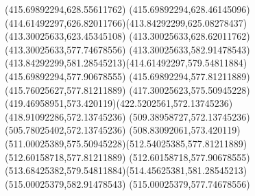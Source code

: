 {{{\lineto(415.69892294,628.55611762)
\lineto(415.69892294,628.46145096)
\curveto(414.61492297,626.82011766)(413.84292299,625.08278437)(413.30025633,623.45345108)
\lineto(413.30025633,628.62011762)
\closepath
\moveto(413.30025633,577.74678556)
\lineto(413.30025633,582.91478543)
\curveto(413.84292299,581.28545213)(414.61492297,579.54811884)(415.69892294,577.90678555)
\lineto(415.69892294,577.81211889)
\lineto(415.76025627,577.81211889)
\curveto(417.30025623,575.50945228)(419.46958951,573.420119)(422.5202561,572.13745236)
\lineto(418.91092286,572.13745236)
\closepath
\moveto(509.38958727,572.13745236)
\lineto(505.78025402,572.13745236)
\curveto(508.83092061,573.420119)(511.00025389,575.50945228)(512.54025385,577.81211889)
\lineto(512.60158718,577.81211889)
\lineto(512.60158718,577.90678555)
\curveto(513.68425382,579.54811884)(514.45625381,581.28545213)(515.00025379,582.91478543)
\lineto(515.00025379,577.74678556)
\closepath
}
}

}

